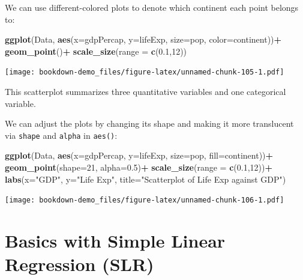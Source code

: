 \documentclass[
]{book}
\newenvironment{Shaded}{\begin{snugshade}}{\end{snugshade}}
\newcommand{\AttributeTok}[1]{\textcolor[rgb]{0.13,0.29,0.53}{#1}}
\newcommand{\DecValTok}[1]{\textcolor[rgb]{0.00,0.00,0.81}{#1}}
\newcommand{\FloatTok}[1]{\textcolor[rgb]{0.00,0.00,0.81}{#1}}
\newcommand{\FunctionTok}[1]{\textcolor[rgb]{0.13,0.29,0.53}{\textbf{#1}}}
\newcommand{\NormalTok}[1]{#1}
\newcommand{\SpecialCharTok}[1]{\textcolor[rgb]{0.81,0.36,0.00}{\textbf{#1}}}
\newcommand{\StringTok}[1]{\textcolor[rgb]{0.31,0.60,0.02}{#1}}
\begin{document}
We can use different-colored plots to denote which continent each point belongs to:

\begin{Shaded}
\begin{Highlighting}[]
\FunctionTok{ggplot}\NormalTok{(Data, }\FunctionTok{aes}\NormalTok{(}\AttributeTok{x=}\NormalTok{gdpPercap, }\AttributeTok{y=}\NormalTok{lifeExp, }\AttributeTok{size=}\NormalTok{pop, }\AttributeTok{color=}\NormalTok{continent))}\SpecialCharTok{+}
  \FunctionTok{geom\_point}\NormalTok{()}\SpecialCharTok{+}
  \FunctionTok{scale\_size}\NormalTok{(}\AttributeTok{range =} \FunctionTok{c}\NormalTok{(}\FloatTok{0.1}\NormalTok{,}\DecValTok{12}\NormalTok{))}
\end{Highlighting}
\end{Shaded}

\texttt{[image: bookdown-demo\_files/figure-latex/unnamed-chunk-105-1.pdf]}

This scatterplot summarizes three quantitative variables and one categorical variable.

We can adjust the plots by changing its shape and making it more translucent via \texttt{shape} and \texttt{alpha} in \texttt{aes()}:

\begin{Shaded}
\begin{Highlighting}[]
\FunctionTok{ggplot}\NormalTok{(Data, }\FunctionTok{aes}\NormalTok{(}\AttributeTok{x=}\NormalTok{gdpPercap, }\AttributeTok{y=}\NormalTok{lifeExp, }\AttributeTok{size=}\NormalTok{pop, }\AttributeTok{fill=}\NormalTok{continent))}\SpecialCharTok{+}
  \FunctionTok{geom\_point}\NormalTok{(}\AttributeTok{shape=}\DecValTok{21}\NormalTok{, }\AttributeTok{alpha=}\FloatTok{0.5}\NormalTok{)}\SpecialCharTok{+}
  \FunctionTok{scale\_size}\NormalTok{(}\AttributeTok{range =} \FunctionTok{c}\NormalTok{(}\FloatTok{0.1}\NormalTok{,}\DecValTok{12}\NormalTok{))}\SpecialCharTok{+}
  \FunctionTok{labs}\NormalTok{(}\AttributeTok{x=}\StringTok{"GDP"}\NormalTok{, }\AttributeTok{y=}\StringTok{"Life Exp"}\NormalTok{, }\AttributeTok{title=}\StringTok{"Scatterplot of Life Exp against GDP"}\NormalTok{)}
\end{Highlighting}
\end{Shaded}

\texttt{[image: bookdown-demo\_files/figure-latex/unnamed-chunk-106-1.pdf]}

\hypertarget{slr}{%
\chapter{Basics with Simple Linear Regression (SLR)}\label{slr}}
\end{document}

